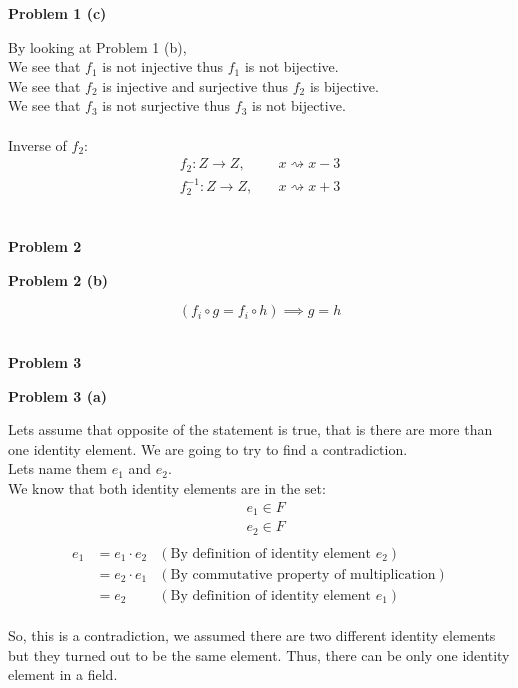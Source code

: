 \documentclass{article}
\begin{document}
\begin{flushleft}
   \textbf{\Large Problem 1 (c)}
\end{flushleft}

By looking at Problem 1 (b), \\
We see that \(f_1\) is not injective thus \(f_1\) is not bijective. \\
We see that \(f_2\) is injective and surjective thus \(f_2\) is bijective. \\
We see that \(f_3\) is not surjective thus \(f_3\) is not bijective. \\
\\
Inverse of \(f_2\):
\begin{align*}
   f_2: Z \rightarrow Z,& \quad x \rightsquigarrow x - 3 \\
   f_2^{-1}: Z \rightarrow Z,& \quad x \rightsquigarrow x + 3 \\
\end{align*}
\\

\begin{flushleft}
   \textbf{\Large Problem 2}
\end{flushleft}


\begin{flushleft}
   \textbf{\Large Problem 2 (b)}
\end{flushleft}

\[
   (f_i \circ g = f_i \circ h) \implies g = h
\]
\\


\begin{flushleft}
   \textbf{\Large Problem 3}
\end{flushleft}


\begin{flushleft}
   \textbf{\Large Problem 3 (a)}
\end{flushleft}

Lets assume that opposite of the statement is true, that is there are more than one identity element. We are going to try to find a contradiction. \\
Lets name them \(e_1\) and \(e_2\). \\
We know that both identity elements are in the set:
\begin{align*}
   & e_1 \in F \\
   & e_2 \in F \\
\end{align*}
\begin{align}
   e_1 & = e_1 \cdot e_2 & (\text{By definition of identity element \(e_2\)}) \\
       & = e_2 \cdot e_1 & (\text{By commutative property of multiplication}) \\
       & = e_2           & (\text{By definition of identity element \(e_1\)})
\end{align}
\\
So, this is a contradiction, we assumed there are two different identity elements but they turned out to be the same element. Thus, there can be only one identity element in a field. \\
\end{document}
